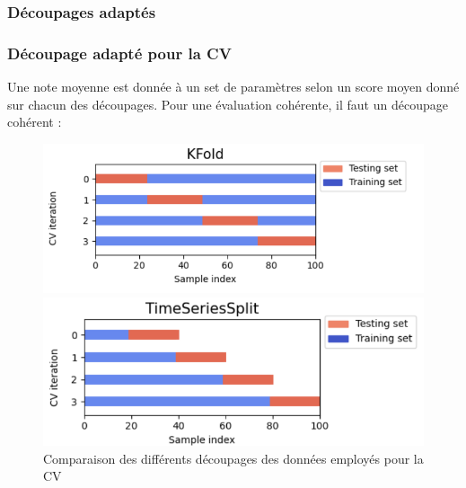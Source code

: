 \documentclass{beamer}
\begin{document}
\subsubsection{Découpages adaptés}
\begin{frame}
	\frametitle{Découpage adapté pour la CV}
		Une note moyenne est donnée à un set de paramètres selon un score moyen donné sur chacun des découpages.
		Pour une évaluation cohérente, il faut un découpage cohérent :
		\begin{figure}[h]
			\centering
			\begin{minipage}{0.4\textwidth}
				\includegraphics[scale=0.25]{kfold}
			\end{minipage}
			\begin{minipage}{0.4\textwidth}
				\includegraphics[scale=0.25]{tscv}
			\end{minipage}
		\caption{Comparaison des différents découpages des données employés pour la CV}
		\end{figure}
\end{frame}
\end{document}
